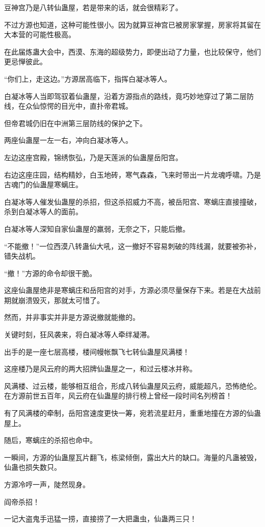 \begin{this_body}
豆神宫乃是八转仙蛊屋，若是带来的话，就会很精彩了。

不过方源也知道，这种可能性很小。因为就算豆神宫已被房家掌握，房家将其留在大本营的可能性极高。

在此届炼蛊大会中，西漠、东海的超级势力，即便出动了力量，也比较保守，他们更忌惮彼此。

“你们上，走这边。”方源居高临下，指挥白凝冰等人。

白凝冰等人当即驾驭着仙蛊屋，沿着方源指点的路线，竟巧妙地穿过了第二层防线，在众仙惊愕的目光中，直扑帝君城。

但帝君城仍旧在中洲第三层防线的保护之下。

两座仙蛊屋一左一右，冲向白凝冰等人。

左边这座宫殿，锦绣恢弘，乃是天莲派的仙蛊屋岳阳宫。

右边这座庄园，结构精妙，白玉地砖，寒气森森，飞来时带出一片龙魂呼啸。乃是古魂门的仙蛊屋寒螭庄。

白凝冰等人催发仙蛊屋的杀招，但这杀招威力不高，被岳阳宫、寒螭庄直接撞破，杀到白凝冰等人的面前。

白凝冰等人深知自家仙蛊屋的羸弱，无奈之下，只能后撤。

“不能撤！”一位西漠八转蛊仙大吼，这一撤好不容易刺破的阵线漏，就要被弥补，错失战机。

“撤！”方源的命令却很干脆。

这座仙蛊屋绝非是寒螭庄和岳阳宫的对手，方源必须尽量保存下来。若是在大战前期就崩溃毁灭，那就太可惜了。

然而，并非事实并非是方源说撤就能撤的。

关键时刻，狂风袭来，将白凝冰等人牵绊凝滞。

出手的是一座七层高楼，楼间幔帐飘飞七转仙蛊屋风满楼！

这座楼乃是风云府的两大招牌仙蛊屋之一，和过云楼冰并称。

风满楼、过云楼，能够相互组合，形成八转仙蛊屋风云府，威能超凡，恐怖绝伦。在方源前世五百年，风云府在仙蛊屋的排行榜上曾经一段时间名列榜首！

有了风满楼的牵制，岳阳宫速度更快一筹，宛若流星赶月，重重地撞在方源的仙蛊屋上。

随后，寒螭庄的杀招也命中。

一瞬间，方源的仙蛊屋瓦片翻飞，栋梁倾倒，露出大片的缺口。海量的凡蛊被毁，仙蛊也损失数只。

方源冷哼一声，陡然现身。

阎帝杀招！

一记大盗鬼手迅猛一捞，直接捞了一大把蛊虫，仙蛊两三只！

\end{this_body}

